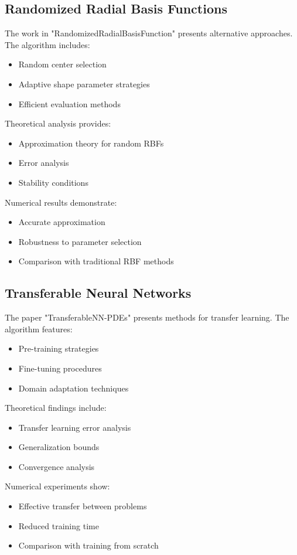 \documentclass[12pt]{article}
\begin{document}
\subsection{Randomized Radial Basis Functions}
\label{subsec:rbf}
The work in "RandomizedRadialBasisFunction" presents alternative approaches. The algorithm includes:
\begin{itemize}
    \item Random center selection
    \item Adaptive shape parameter strategies
    \item Efficient evaluation methods
\end{itemize}
Theoretical analysis provides:
\begin{itemize}
    \item Approximation theory for random RBFs
    \item Error analysis
    \item Stability conditions
\end{itemize}
Numerical results demonstrate:
\begin{itemize}
    \item Accurate approximation
    \item Robustness to parameter selection
    \item Comparison with traditional RBF methods
\end{itemize}

\subsection{Transferable Neural Networks}
\label{subsec:transferable}
The paper "TransferableNN-PDEs" presents methods for transfer learning. The algorithm features:
\begin{itemize}
    \item Pre-training strategies
    \item Fine-tuning procedures
    \item Domain adaptation techniques
\end{itemize}
Theoretical findings include:
\begin{itemize}
    \item Transfer learning error analysis
    \item Generalization bounds
    \item Convergence analysis
\end{itemize}
Numerical experiments show:
\begin{itemize}
    \item Effective transfer between problems
    \item Reduced training time
    \item Comparison with training from scratch
\end{itemize}
\end{document}
